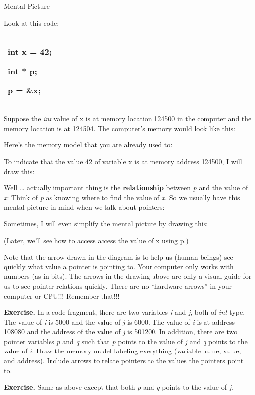\documentclass[
]{article}
\begin{document}
Mental Picture

Look at this code:

\begin{longtable}[]{@{}l@{}}
\toprule
\endhead
\begin{minipage}[t]{0.97\columnwidth}\raggedright
int x = 42;

int * p;

p = \&x;\strut
\end{minipage}\tabularnewline
\bottomrule
\end{longtable}

Suppose the \emph{int} value of x is at memory location 124500 in the
computer and the memory location is at 124504. The computer's memory
would look like this:

Here's the memory model that you are already used to:

To indicate that the value 42 of variable x is at memory address 124500,
I will draw this:

Well \ldots{} actually important thing is the \textbf{relationship}
between \emph{p} and the value of \emph{x}: Think of \emph{p} as knowing
where to find the value of \emph{x}. So we usually have this mental
picture in mind when we talk about pointers:

Sometimes, I will even simplify the mental picture by drawing this:

(Later, we'll see how to access access the value of x using p.)

Note that the arrow drawn in the diagram is to help us (human beings)
see quickly what value a pointer is pointing to. Your computer only
works with numbers (as in bits). The arrows in the drawing above are
only a visual guide for us to see pointer relations quickly. There are
no ``hardware arrows'' in your computer or CPU!!! Remember that!!!

\textbf{Exercise. }In a code fragment, there are two variables \emph{i}
and \emph{j}, both of \emph{int} type. The value of \emph{i} is 5000 and
the value of \emph{j} is 6000. The value of \emph{i} is at address
108080 and the address of the value of \emph{j} is 501200. In addition,
there are two pointer variables \emph{p} and \emph{q} such that \emph{p}
points to the value of \emph{j} and \emph{q} points to the value of
\emph{i}. Draw the memory model labeling everything (variable name,
value, and address). Include arrows to relate pointers to the values the
pointers point to.

\textbf{Exercise. }Same as above except that both \emph{p} and \emph{q}
points to the value of \emph{j}.
\end{document}
